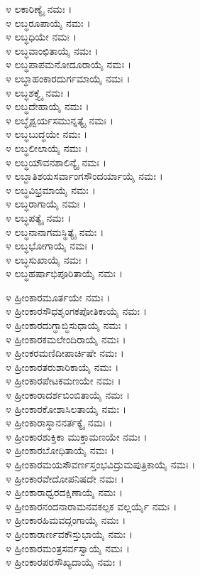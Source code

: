 
೪ ಲಕಾರಿಣ್ಯೈ ನಮಃ ।\\
೪ ಲಬ್ಧರೂಪಾಯೈ ನಮಃ ।\\
೪ ಲಬ್ಧಧಿಯೇ ನಮಃ ।\\
೪ ಲಬ್ಧವಾಂಛಿತಾಯೈ ನಮಃ ।\\
೪ ಲಬ್ಧಪಾಪಮನೋದೂರಾಯೈ ನಮಃ ।\\
೪ ಲಬ್ಧಾಹಂಕಾರದುರ್ಗಮಾಯೈ ನಮಃ ।\\
೪ ಲಬ್ಧಶಕ್ತ್ಯೈ ನಮಃ ।\\
೪ ಲಬ್ಧದೇಹಾಯೈ ನಮಃ ।\\
೪ ಲಬ್ಧೈಶ್ವರ್ಯಸಮುನ್ನತ್ಯೈ ನಮಃ ।\\
೪ ಲಬ್ಧಬುದ್ಧಯೇ ನಮಃ ।\\
೪ ಲಬ್ಧಲೀಲಾಯೈ ನಮಃ ।\\
೪ ಲಬ್ಧಯೌವನಶಾಲಿನ್ಯೈ ನಮಃ ।\\
೪ ಲಬ್ಧಾತಿಶಯಸರ್ವಾಂಗಸೌಂದರ್ಯಾಯೈ ನಮಃ ।\\
೪ ಲಬ್ಧವಿಭ್ರಮಾಯೈ ನಮಃ ।\\
೪ ಲಬ್ಧರಾಗಾಯೈ ನಮಃ ।\\
೪ ಲಬ್ಧಪತ್ಯೈ ನಮಃ ।\\
೪ ಲಬ್ಧನಾನಾಗಮಸ್ಥಿತ್ಯೈ ನಮಃ ।\\
೪ ಲಬ್ಧಭೋಗಾಯೈ ನಮಃ ।\\
೪ ಲಬ್ಧಸುಖಾಯೈ ನಮಃ ।\\
೪ ಲಬ್ಧಹರ್ಷಾಭಿಪೂರಿತಾಯೈ ನಮಃ ।


೪ ಹ್ರೀಂಕಾರಮೂರ್ತಯೇ ನಮಃ ।\\
೪ ಹ್ರೀಂಕಾರಸೌಧಶೃಂಗಕಪೋತಿಕಾಯೈ ನಮಃ ।\\
೪ ಹ್ರೀಂಕಾರದುಗ್ಧಾಬ್ಧಿಸುಧಾಯೈ ನಮಃ ।\\
೪ ಹ್ರೀಂಕಾರಕಮಲೇಂದಿರಾಯೈ ನಮಃ ।\\
೪ ಹ್ರೀಂಕರಮಣಿದೀಪಾರ್ಚಿಷೇ ನಮಃ ।\\
೪ ಹ್ರೀಂಕಾರತರುಶಾರಿಕಾಯೈ ನಮಃ ।\\
೪ ಹ್ರೀಂಕಾರಪೇಟಕಮಣಯೇ ನಮಃ ।\\
೪ ಹ್ರೀಂಕಾರಾದರ್ಶಬಿಂಬಿತಾಯೈ ನಮಃ ।\\
೪ ಹ್ರೀಂಕಾರಕೋಶಾಸಿಲತಾಯೈ ನಮಃ ।\\
೪ ಹ್ರೀಂಕಾರಾಸ್ಥಾನನರ್ತಕ್ಯೈ ನಮಃ ।\\
೪ ಹ್ರೀಂಕಾರಶುಕ್ತಿಕಾ ಮುಕ್ತಾಮಣಯೇ ನಮಃ ।\\
೪ ಹ್ರೀಂಕಾರಬೋಧಿತಾಯೈ ನಮಃ ।\\
೪ ಹ್ರೀಂಕಾರಮಯಸೌವರ್ಣಸ್ತಂಭವಿದ್ರುಮಪುತ್ರಿಕಾಯೈ ನಮಃ ।\\
೪ ಹ್ರೀಂಕಾರವೇದೋಪನಿಷದೇ ನಮಃ ।\\
೪ ಹ್ರೀಂಕಾರಾಧ್ವರದಕ್ಷಿಣಾಯೈ ನಮಃ ।\\
೪ ಹ್ರೀಂಕಾರನಂದನಾರಾಮನವಕಲ್ಪಕ ವಲ್ಲರ್ಯೈ ನಮಃ ।\\
೪ ಹ್ರೀಂಕಾರಹಿಮವದ್ಗಂಗಾಯೈ ನಮಃ ।\\
೪ ಹ್ರೀಂಕಾರಾರ್ಣವಕೌಸ್ತುಭಾಯೈ ನಮಃ ।\\
೪ ಹ್ರೀಂಕಾರಮಂತ್ರಸರ್ವಸ್ವಾಯೈ ನಮಃ ।\\
೪ ಹ್ರೀಂಕಾರಪರಸೌಖ್ಯದಾಯೈ ನಮಃ ।

